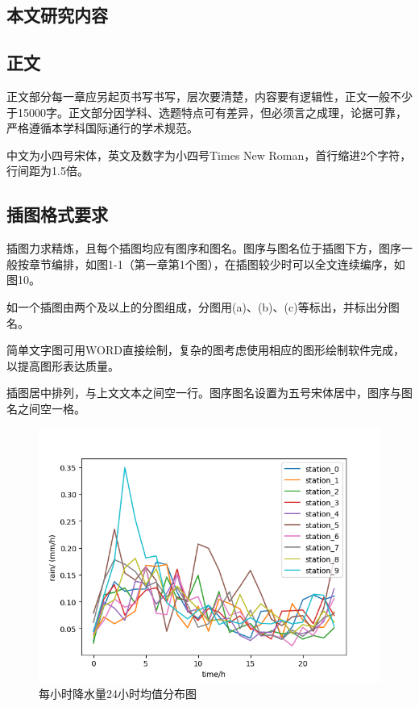 \documentclass{seuthesis-2022}
\begin{document}
\subsection{本文研究内容}

\subsection{正文}
正文部分每一章应另起页书写书写，层次要清楚，内容要有逻辑性，正文一般不少于15000字。正文部分因学科、选题特点可有差异，但必须言之成理，论据可靠，严格遵循本学科国际通行的学术规范。

中文为小四号宋体，英文及数字为小四号Times New Roman，首行缩进2个字符，行间距为1.5倍。

\subsection{插图格式要求}
插图力求精炼，且每个插图均应有图序和图名。图序与图名位于插图下方，图序一般按章节编排，如图1-1（第一章第1个图），在插图较少时可以全文连续编序，如图10。

如一个插图由两个及以上的分图组成，分图用(a)、(b)、(c)等标出，并标出分图名。

简单文字图可用WORD直接绘制，复杂的图考虑使用相应的图形绘制软件完成，以提高图形表达质量。

插图居中排列，与上文文本之间空一行。图序图名设置为五号宋体居中，图序与图名之间空一格。

\begin{figure}[H]
    \centering
    \includegraphics{fig/降水量均值分布图.png}
    \caption{每小时降水量24小时均值分布图}
    \label{fig:1}
\end{figure}
\end{document}
